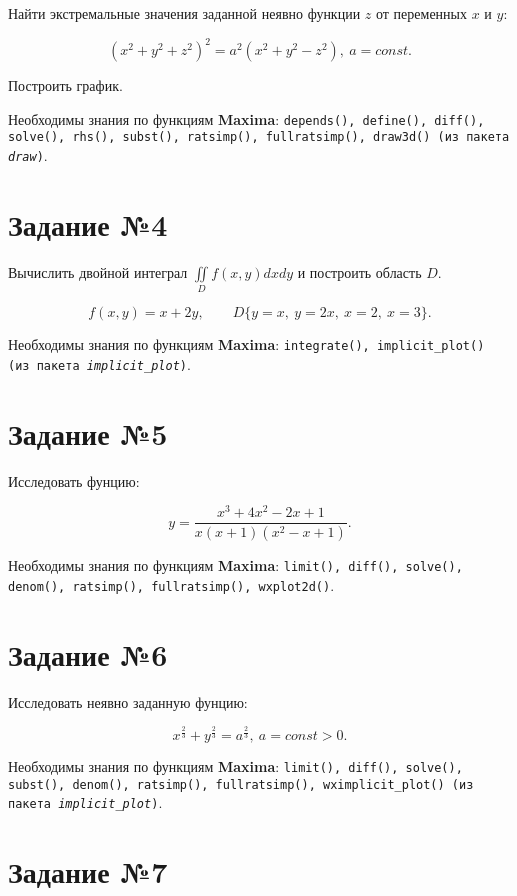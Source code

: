     Найти экстремальные значения заданной неявно функции $z$ от переменных $x$ и $y$:

    \[
        \left( x^{2} + y^{2} + z^{2} \right)^{2} = a^{2} \left( x^{2} + y^{2} - z^{2} \right), \: a = const.
    \]

    Построить график.

    Необходимы знания по функциям \textbf{Maxima}: {\tt depends(), define(), diff(), solve(), rhs(), subst(), ratsimp(), fullratsimp(), draw3d() (из пакета \textit{draw})}.

\section*{Задание №4}

	Вычислить двойной интеграл $\iint\limits_{D} f(x,y) dx dy$ и построить область $D$.

	\[
		f(x,y) = x + 2 y, \qquad D \{ y = x, \: y = 2 x, \: x = 2, \: x = 3 \}.
	\]

	Необходимы знания по функциям \textbf{Maxima}: {\tt integrate(), implicit\_plot() (из пакета \textit{implicit\_plot})}.


\section*{Задание №5}

    Исследовать фунцию:

    \[
        y = \frac{x^{3} + 4 x^{2} - 2 x + 1}{x (x + 1) (x^2 - x + 1)}.
    \]

	Необходимы знания по функциям \textbf{Maxima}: {\tt limit(), diff(), solve(), denom(), ratsimp(), fullratsimp(), wxplot2d()}.

\section*{Задание №6}

    Исследовать неявно заданную фунцию:

    \[
        x^{\frac{2}{3}} + y^{\frac{2}{3}} = a^{\frac{2}{3}}, \: a = const > 0.
    \]

    Необходимы знания по функциям \textbf{Maxima}: {\tt limit(), diff(), solve(), subst(), denom(), ratsimp(), fullratsimp(), wximplicit\_plot() (из пакета \textit{implicit\_plot})}.

\section*{Задание №7}

